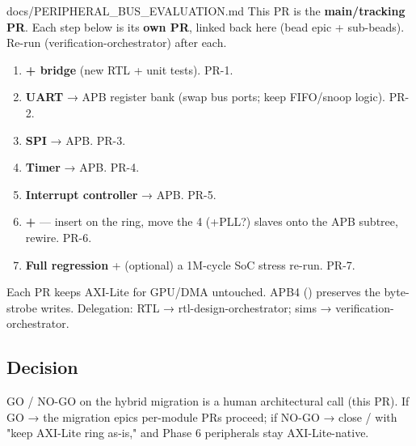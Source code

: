 \begin{relocated}{docs/PERIPHERAL_BUS_EVALUATION.md}
This PR is the \textbf{main/\allowbreak{}tracking PR}. Each step below
is its \textbf{own PR}, linked back here (bead
 epic + sub-beads). Re-run 
(verification-orchestrator) after each.

\begin{enumerate}
\def\labelenumi{\arabic{enumi}.}
\tightlist
\item
  \textbf{ +  bridge}
  (new RTL + unit tests). PR-1.
\item
  \textbf{UART} → APB register bank (swap bus ports; keep
  FIFO/\allowbreak{}snoop logic). PR-2.
\item
  \textbf{SPI} → APB. PR-3.
\item
  \textbf{Timer} → APB. PR-4.
\item
  \textbf{Interrupt controller} → APB. PR-5.
\item
  \textbf{ + } --- insert
   on the ring, move the 4 (+PLL?) slaves onto the APB
  subtree, rewire. PR-6.
\item
  \textbf{Full  regression} + (optional) a 1M-cycle SoC
  stress re-run. PR-7.
\end{enumerate}

Each PR keeps AXI-Lite for GPU/DMA untouched. APB4 ()
preserves the byte-strobe writes. Delegation: RTL →
rtl-design-orchestrator; sims → verification-orchestrator.

\subsection{Decision}\label{tm:dec:peripheral-bus:5-decision}

GO / NO-GO on the hybrid migration is a human architectural call (this
PR). If GO → the  migration epic\textquotesingle s per-module
PRs proceed; if NO-GO → close / with "keep AXI-Lite
ring as-is," and Phase 6 peripherals stay AXI-Lite-native.
\end{relocated}

